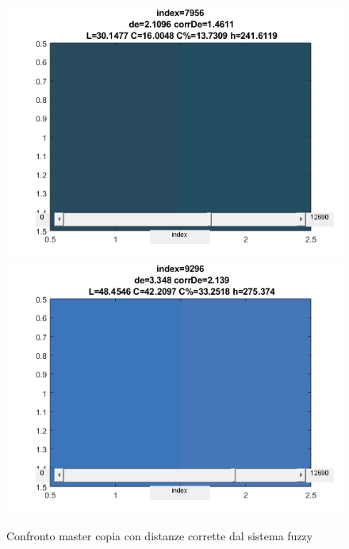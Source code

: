 \begin{figure}[!ht]
\begin{center}
	\includegraphics[scale=0.5]{images/7956.png}
	\includegraphics[scale=0.5]{images/9296.png}
\end{center}
\caption{Confronto master copia con distanze corrette dal sistema fuzzy}
\label{fig:decorrde}
\end{figure}

